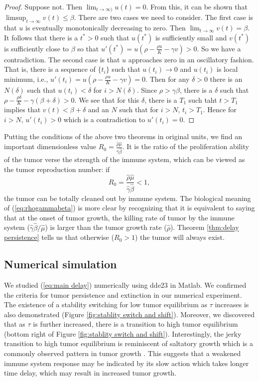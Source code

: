 \documentclass{aims}
\theoremstyle{definition}
\begin{document}
\begin{proof}
Suppose not. Then $\lim_{t\to\infty)} u(t)=0$. From this, it can be shown that $\limsup_{t\to\infty} v(t) \leq \beta$.  There are two cases we need to consider. The first case
is that $u$ is eventually monotonically decreasing to zero. Then
$\lim_{t\to\infty}v(t)=\beta$. It follows that there is a $t^{*}>0$
such that  $u(t^{*})$ is sufficiently small and $v(t^{*})$ is sufficiently close to $\beta$ so that
$u'(t^{*})=u(\rho-\frac{\rho u}{K}-\gamma v)>0$. So we have a contradiction.
The second case is that $u$ approaches zero in an oscillatory fashion.
That is, there is a sequence of $\{t_{i}\}$ such that $u(t_{i})\to0$
and $u(t_{i})$ is local minimum, i.e., $u'(t_{i})=u(\rho-\frac{\rho u}{K}-\gamma v)=0$.
Then for any $\delta>0$ there is an $N(\delta)$ such that  $u(t_{i})<\delta$
for $i>N(\delta)$. Since $\rho>\gamma \beta$, there is a $\delta$ such that $\rho-\frac{\rho\delta}{K}-\gamma(\beta+\delta)>0$. We see that for this $\delta$, there is a $T_1$ such taht $t>T_1$ implies that $v(t)<\beta + \delta$ and an $N$ such that for $i>N$, $t_i>T_1$. Hence for $i>N$, $u'(t_i)>0$ which is a contradiction to $u'(t_i)=0$.  
\end{proof}
Putting the conditions of the above two theorems in original units,
we find an important dimensionless value $R_0=\frac{\hat{\rho}\hat{\mu}}{\hat{\gamma}\hat{\beta}}$.
It is the ratio of the proliferation ability of
the tumor verse the strength of the immune system, which can be viewed as the tumor reproduction number: if 
\begin{equation}
R_0=\frac{\hat{\rho}\hat{\mu}}{\hat{\gamma}\hat{\beta}}<1,\label{eq:rhogammabeta}
\end{equation}
 the tumor can be totally cleaned out by immune system. The biological meaning of  (\ref{eq:rhogammabeta}) is more clear by recognizing that it is equivalent to saying that at the onset of tumor growth, the killing rate of tumor by the immune system ($\hat{\gamma} \hat{\beta} / \hat{\mu}$) is larger than the tumor growth rate ($\hat{\rho}$). Theorem \ref{thm:delay persistence} tells us that otherwise ($R_0>1$) the tumor will always exist. 

\subsection{Numerical simulation}

We studied (\ref{eq:main delay}) numerically using dde23 in Matlab.
We confirmed the criteria for tumor persistence and extinction in
our numerical experiment. The existence of a stability switching for
low tumor equilibrium as $\tau$ increases is also demonstrated (Figure
\ref{fig:stablity switch and shift}). Moreover, we discovered that
as $\tau$ is further increased, there is a transition to high
tumor equilibrium (bottom right of Figure \ref{fig:stablity switch and shift}).
Interestingly, the jerky transition to high tumor equilibrium is reminiscent
of saltatory growth which is a commonly observed pattern in tumor
growth \cite{KuangOncologyBook}. This suggests that a weakened immune system response may be indicated by its slow action which takes longer time delay, which may result in increased tumor growth. 
\end{document}
